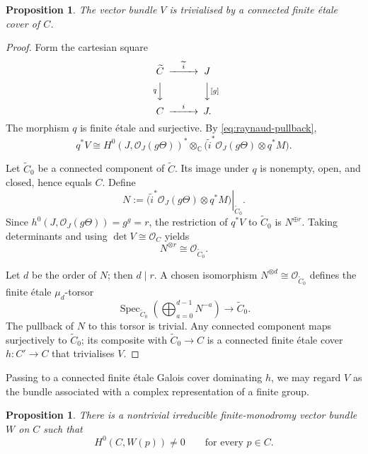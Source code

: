 \documentclass[10pt,a4paper,reqno]{amsart}
\newtheorem{proposition}[theorem]{Proposition}
\theoremstyle{remark}
\newcommand{\CC}{\mathbb{C}}
\newcommand{\OO}{\mathcal{O}}
\newcommand{\tens}{\otimes}
\DeclareMathOperator{\Spec}{Spec}
\begin{document}
\begin{proposition}\label{prop:finite-monodromy}
The vector bundle $V$ is trivialised by a connected finite \'{e}tale cover of
$C$.
\end{proposition}

\begin{proof}
Form the cartesian square
\[
\begin{CD}
  \widetilde C @>{\widetilde i}>> J\\
  @V{q}VV                         @VV{[g]}V\\
  C              @>{i}>>          J.
\end{CD}
\]
The morphism $q$ is finite \'{e}tale and surjective.  By
\eqref{eq:raynaud-pullback},
\[
  q^*V
  \cong
  H^0\!\left(J,\OO_J(g\Theta)\right)^*
  \tens_{\CC}
  \bigl(\widetilde i^*\OO_J(g\Theta)\tens q^*M\bigr).
\]

Let $\widetilde C_0$ be a connected component of $\widetilde C$.  Its image
under $q$ is nonempty, open, and closed, hence equals $C$.  Define
\[
  N:=\left.
  \bigl(\widetilde i^*\OO_J(g\Theta)\tens q^*M\bigr)
  \right|_{\widetilde C_0}.
\]
Since $h^0(J,\OO_J(g\Theta))=g^g=r$, the restriction of $q^*V$ to
$\widetilde C_0$ is $N^{\oplus r}$.  Taking determinants and using
$\det V\cong\OO_C$ yields
\[
  N^{\tens r}\cong\OO_{\widetilde C_0}.
\]

Let $d$ be the order of $N$; then $d\mid r$.  A chosen isomorphism
$N^{\tens d}\cong\OO_{\widetilde C_0}$ defines the finite \'{e}tale
$\mu_d$-torsor
\[
  \Spec_{\widetilde C_0}
  \left(\bigoplus_{a=0}^{d-1}N^{-a}\right)
  \longrightarrow \widetilde C_0 .
\]
The pullback of $N$ to this torsor is
trivial.  Any connected component maps surjectively to $\widetilde C_0$; its
composite with $\widetilde C_0\to C$ is a connected finite \'{e}tale cover
$h\colon C'\to C$ that trivialises $V$.
\end{proof}

Passing to a connected finite \'{e}tale Galois cover dominating $h$, we may
regard $V$ as the bundle associated with a complex representation of a finite
group.

\begin{proposition}\label{prop:irreducible-summand}
There is a nontrivial irreducible finite-monodromy vector bundle $W$ on $C$
such that
\[
  H^0(C,W(p))\neq 0
  \qquad\text{for every }p\in C.
\]
\end{proposition}
\end{document}
